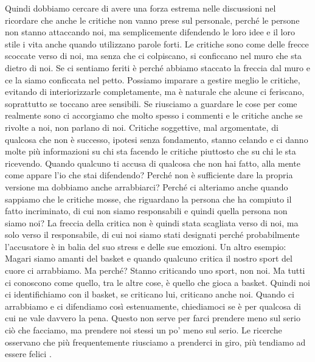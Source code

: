 \documentclass[12pt]{book} %
\begin{document}
Quindi dobbiamo cercare di avere una forza estrema nelle discussioni nel ricordare che anche le critiche non vanno prese
sul personale, perché le persone non stanno attaccando noi, ma semplicemente difendendo le loro idee e il loro stile i
vita anche quando utilizzano parole forti. Le critiche sono come delle frecce scoccate verso di noi, ma
senza che ci colpiscano, si conficcano nel muro che sta dietro di noi. Se ci sentiamo feriti è perché abbiamo staccato
la freccia dal muro e ce la siamo conficcata nel petto. Possiamo imparare a gestire meglio le critiche, evitando di interiorizzarle completamente, ma è naturale che alcune ci feriscano, soprattutto se toccano aree sensibili. Se riusciamo a guardare le cose per come realmente sono ci
accorgiamo che molto spesso i commenti e le critiche anche se rivolte a noi, non parlano di noi. Critiche soggettive,
mal argomentate, di qualcosa che non è successo, ipotesi senza fondamento, stanno celando e ci danno molte più
informazioni su chi sta facendo le critiche piuttosto che su chi le sta ricevendo. Quando qualcuno ti accusa di
qualcosa che non hai fatto, alla mente come appare l'io che stai difendendo? Perché non è
sufficiente dare la propria versione ma dobbiamo anche arrabbiarci? Perché ci alteriamo anche quando sappiamo che le
critiche mosse, che riguardano la persona che ha compiuto il fatto incriminato, di cui non siamo responsabili e quindi
quella persona non siamo noi? La freccia della critica non è quindi stata scagliata verso di noi, ma solo verso il
responsabile, di cui noi siamo stati designati perché probabilmente l'accusatore è in balia del
suo stress e delle sue emozioni. Un altro esempio: Magari siamo amanti del basket e quando qualcuno critica il nostro
sport del cuore ci arrabbiamo. Ma perché? Stanno criticando uno sport, non noi. Ma tutti ci conoscono come quello, tra
le altre cose, è quello che gioca a basket. Quindi noi ci identifichiamo con il basket, se criticano lui, criticano
anche noi. Quando ci arrabbiamo e ci difendiamo così estenuamente, chiediamoci se è per qualcosa di cui ne vale davvero la pena. Questo non serve per farci prendere meno sul serio ciò che facciamo, ma prendere noi
stessi un po' meno sul serio. 
Le ricerche osservano che più frequentemente riusciamo a prenderci in giro, più tendiamo ad essere felici .
\end{document}
